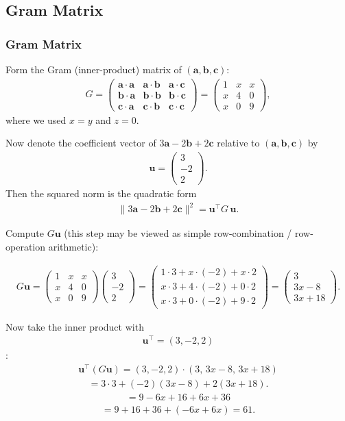 \documentclass{beamer}
\theoremstyle{remark}
\newcommand{\myvec}[1]{\ensuremath{\begin{pmatrix}#1\end{pmatrix}}}
\let\vec\mathbf
\numberwithin{equation}{section}
\begin{document}
\subsection{Gram Matrix}
\begin{frame}
\frametitle{Gram Matrix}
Form the Gram (inner-product) matrix of $(\vec a,\vec b,\vec c)$:
\begin{align}
G=\myvec
{\vec a\cdot\vec a & \vec a\cdot\vec b & \vec a\cdot\vec c\\
\vec b\cdot\vec a & \vec b\cdot\vec b & \vec b\cdot\vec c\\
\vec c\cdot\vec a & \vec c\cdot\vec b & \vec c\cdot\vec c}
=
\myvec
{1 & x & x\\
x & 4 & 0\\
x & 0 & 9}
,
\end{align}
where we used $x=y$ and $z=0$.

Now denote the coefficient vector of $3\vec a-2\vec b+2\vec c$ relative to $(\vec a,\vec b,\vec c)$ by
\begin{align}
\mathbf{u}=\begin{pmatrix}3\\-2\\2\end{pmatrix}.
\end{align}
Then the squared norm is the quadratic form
\begin{align}
\bigl\lVert 3\vec a-2\vec b+2\vec c\bigr\rVert^2
= \mathbf{u}^\top G\,\mathbf{u}.
\end{align}

Compute $G\mathbf{u}$ (this step may be viewed as simple row-combination / row-operation arithmetic):

\end{frame}
\begin{frame}
\begin{align}
G\mathbf{u}
=\myvec
{1 & x & x\\
x & 4 & 0\\
x & 0 & 9}
\myvec 
{3\\-2\\2 }
=
\myvec
{1\cdot 3 + x\cdot(-2)+x\cdot 2\\
x\cdot 3 + 4\cdot(-2) +0\cdot 2\\
x\cdot 3 +0\cdot(-2)+9\cdot 2}
=
\myvec {3\\3x-8\\3x+18} .
\end{align}

Now take the inner product with 
\begin{align}
\mathbf{u}^\top=(3,-2,2)
\end{align} :
\begin{align}
\mathbf{u}^\top (G\mathbf{u})
= (3,-2,2)\cdot (3,\,3x-8,\,3x+18)
\end{align}
\begin{align}
=3\cdot 3 + (-2)(3x-8) + 2(3x+18).
\end{align}
\begin{align}
=9 -6x +16 +6x +36 
\end{align}
\begin{align}
= 9+16+36 +(-6x+6x)=61.
\end{align}
\end{frame}
\end{document}
